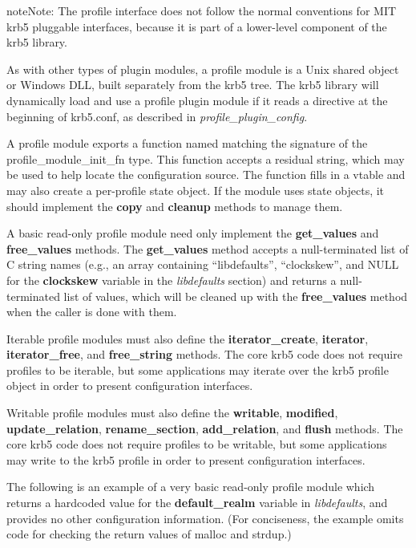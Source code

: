 \documentclass[letterpaper,10pt,english]{sphinxmanual}
\begin{document}
\begin{notice}{note}{Note:}
The profile interface does not follow the normal conventions
for MIT krb5 pluggable interfaces, because it is part of a
lower-level component of the krb5 library.
\end{notice}

As with other types of plugin modules, a profile module is a Unix
shared object or Windows DLL, built separately from the krb5 tree.
The krb5 library will dynamically load and use a profile plugin module
if it reads a  directive at the beginning of krb5.conf, as
described in \emph{profile\_plugin\_config}.

A profile module exports a function named 
matching the signature of the profile\_module\_init\_fn type.  This
function accepts a residual string, which may be used to help locate
the configuration source.  The function fills in a vtable and may also
create a per-profile state object.  If the module uses state objects,
it should implement the \textbf{copy} and \textbf{cleanup} methods to manage
them.

A basic read-only profile module need only implement the
\textbf{get\_values} and \textbf{free\_values} methods.  The \textbf{get\_values} method
accepts a null-terminated list of C string names (e.g., an array
containing ``libdefaults'', ``clockskew'', and NULL for the \textbf{clockskew}
variable in the \emph{libdefaults} section) and returns a
null-terminated list of values, which will be cleaned up with the
\textbf{free\_values} method when the caller is done with them.

Iterable profile modules must also define the \textbf{iterator\_create},
\textbf{iterator}, \textbf{iterator\_free}, and \textbf{free\_string} methods.  The
core krb5 code does not require profiles to be iterable, but some
applications may iterate over the krb5 profile object in order to
present configuration interfaces.

Writable profile modules must also define the \textbf{writable},
\textbf{modified}, \textbf{update\_relation}, \textbf{rename\_section},
\textbf{add\_relation}, and \textbf{flush} methods.  The core krb5 code does not
require profiles to be writable, but some applications may write to
the krb5 profile in order to present configuration interfaces.

The following is an example of a very basic read-only profile module
which returns a hardcoded value for the \textbf{default\_realm} variable in
\emph{libdefaults}, and provides no other configuration information.
(For conciseness, the example omits code for checking the return
values of malloc and strdup.)
\end{document}
